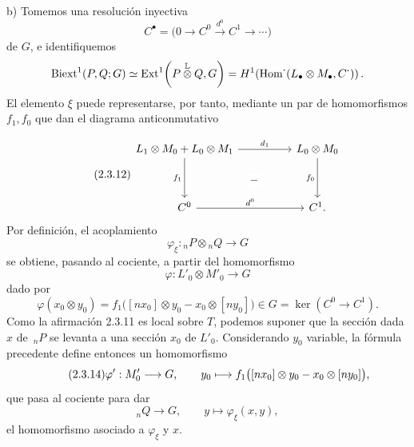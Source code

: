 \medskip
\noindent b) Tomemos una resolución inyectiva
\[
 C^\bullet=\bigl(0\longrightarrow C^0
 \xrightarrow{d^0}C^1\longrightarrow\cdots\bigr)
\]
de $G$, e identifiquemos
\[
 \operatorname{Biext}^1(P,Q;G)
 \simeq
 \operatorname{Ext}^1\!\left(P\mathbin{\overset{\mathbb L}{\otimes}}Q,G\right)
 =H^1\!\left(
   \operatorname{Hom}^{\boldsymbol\cdot}
   (L_\bullet\otimes M_\bullet,C^{\boldsymbol\cdot})
 \right).
\]
El elemento $\xi$ puede representarse, por tanto, mediante un par de
homomorfismos $f_1,f_0$ que dan el diagrama anticonmutativo


\begin{equation}\tag{2.3.12}
\begin{tikzcd}[column sep=huge,row sep=huge]
 L_1\otimes M_0+L_0\otimes M_1
   \arrow[r,"d_1"]
   \arrow[d,"f_1"']
   \arrow[rd,phantom,"-" description]&
 L_0\otimes M_0
   \arrow[d,"f_0"']\\
 C^0\arrow[r,"d^0"]&C^1.
\end{tikzcd}
\end{equation}
Por definición, el acoplamiento
\[
 \varphi_\xi:{}_nP\otimes{}_nQ\longrightarrow G
\]
se obtiene, pasando al cociente, a partir del homomorfismo
\[
 \varphi:L'_0\otimes M'_0\longrightarrow G
\]
dado por
\begin{equation}\tag{2.3.13}
 \varphi(x_0\otimes y_0)
 =f_1\bigl([nx_0]\otimes y_0-x_0\otimes[ny_0]\bigr)
 \in G=\ker(C^0\longrightarrow C^1).
\end{equation}
Como la afirmación 2.3.11 es local sobre $T$, podemos suponer que la
sección dada $x$ de $\,{}_nP$ se levanta a una sección $x_0$ de
$L'_0$. Considerando $y_0$ variable, la fórmula precedente define
entonces un homomorfismo
\begin{equation}\tag{2.3.14}
 \varphi':M'_0\longrightarrow G,
 \qquad
 y_0\longmapsto
 f_1\bigl([nx_0]\otimes y_0
 -x_0\otimes[ny_0]\bigr),
\end{equation}
que pasa al cociente para dar
\[
 {}_nQ\longrightarrow G,
 \qquad
 y\longmapsto\varphi_\xi(x,y),
\]
el homomorfismo asociado a $\varphi_\xi$ y $x$.
